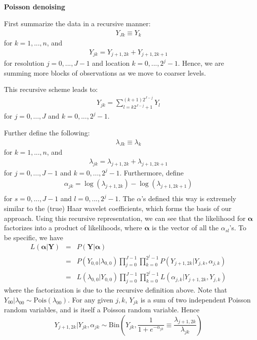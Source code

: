 \documentclass[12pt]{article}
\newcommand{\Ga}{\alpha}
\newcommand{\Gl}{\lambda}    \newcommand{\GL}{\Lambda}
\begin{document}
\begin{appendices}
\section{}\label{app:reconstruction}\bigskip
\textbf{Poisson denoising}

First summarize the data in a recursive manner: 
\begin{eqnarray}
Y_{Jk}\equiv Y_k\end{eqnarray}
for $k=1,...,n$, and
\begin{eqnarray}
Y_{jk}=Y_{j+1,2k}+Y_{j+1,2k+1}
\end{eqnarray}
for resolution $j=0,...,J-1$ and location $k=0,...,2^j-1$. Hence, we are summing more blocks of observations as we move to coarser levels. 

This recursive scheme leads to:
\begin{eqnarray}
Y_{jk}=\sum_{l=k2^{J-j}+1}^{(k+1)2^{J-j}}Y_l
\end{eqnarray}
for $j=0,...,J$ and $k=0,...,2^j-1$.

Further define the following:
\begin{eqnarray}\Gl_{Jk}\equiv \Gl_k\end{eqnarray}
for $k=1,...,n$, and
\begin{eqnarray}\Gl_{jk}=\Gl_{j+1,2k}+\Gl_{j+1,2k+1}\end{eqnarray}
for $j=0,...,J-1$ and $k=0,...,2^j-1$. 
Furthermore, define
\begin{eqnarray}\label{eq:poisson wc}\Ga_{jk}=\log(\Gl_{j+1,2k})-\log(\Gl_{j+1,2k+1})\\\end{eqnarray}
for $s=0,...,J-1$ and $l=0,...,2^j-1$. The ${\Ga}$'s defined this way is extremely similar to the (true) Haar wavelet coefficients, which forms the basis of our approach. Using this recursive representation, we can see that the likelihood for $\bm{\Ga}$ factorizes into a product of likelihoods, where $\bm{\Ga}$ is the vector of all the $\Ga_{sl}$'s. To be specific, we have
\begin{eqnarray}
L(\bm{\Ga}|\mathbf{Y})&=&P(\mathbf{Y}|\bm{\Ga})\\
&=&P(Y_{0,0}|\Gl_{0,0})\prod_{j=0}^{J-1}\prod_{k=0}^{2^j-1}P(Y_{j+1,2k}|Y_{j,k},\Ga_{j,k})\\
&=&L(\Gl_{0,0}|Y_{0,0})\prod_{j=0}^{J-1}\prod_{k=0}^{2^j-1}L(\Ga_{j,k}|Y_{j+1,2k},Y_{j,k})
\end{eqnarray}
where the factorization is due to the recursive definition above. Note that $Y_{00}|\Gl_{00}\sim \textrm{Pois}(\Gl_{00})$. For any given $j,k$, $Y_{jk}$ is a sum of two independent Poisson random variables, and is itself a Poisson random variable. Hence
\[Y_{j+1,2k}|Y_{jk},\Ga_{jk}\sim \textrm{Bin}({Y_{jk},\frac{1}{1+e^{-\Ga_{jk}}}\equiv\frac{\Gl_{j+1,2k}}{\Gl_{jk}}})\]


\end{appendices}
\end{document}
